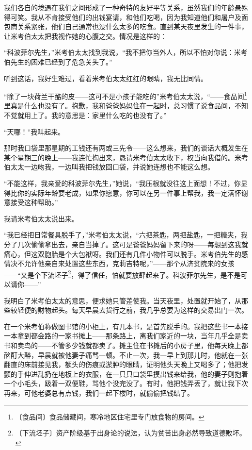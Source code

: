 \documentclass[12pt,UTF-8,openany]{ctexbook}
\begin{document}
\begin{large}
    我们各自的境遇在我们之间形成了一种奇特的友好平等关系，虽然我们的年龄悬殊得可笑。我从不肯接受他们的出钱宴请，和他们吃喝，因为我知道他们和屠户及面包商关系紧张，他们自己通常也没什么太多的吃食。直到某天夜里发生的一件事，让米考伯太太把我视作她的心腹之交。情况是这样的：
    
    “科波菲尔先生，”米考伯太太找到我说，“我不把你当外人，所以不怕对你说：米考伯先生的困难已经到了危急关头了。”
    
    听到这话，我好生难过，看着米考伯太太红红的眼睛，我无比同情。
    
    “除了一块荷兰干酪的皮——这可不是小孩子能吃的”米考伯太太说，“——食品间\footnote{〔食品间〕食品储藏间，寒冷地区住宅里专门放食物的房间。}里真是什么也没有了。抱歉，我和爸爸妈妈住在一起时，总习惯了说食品间，不知不觉就用上了。我的意思是：家里什么吃的也没有了。”
    
    “天哪！”我叫起来。
    
    那时我口袋里那星期的工钱还有两或三先令——这么想来，我们的谈话大概发生在某个星期三的晚上——我连忙掏出来，恳请米考伯太太收下，权当向我借的。米考伯太太一边吻我，一边叫我把钱放回口袋，并说她连想也不能这么想。
    
    “不能这样，我亲爱的科波菲尔先生，”她说，“我压根就没往这上面想！不过，你显得比你的实际年龄要老成，如果你愿意，你可以在另一件事上帮我，我一定满怀谢意接受这种帮助。”
    
    我请米考伯太太说出来。
    
    “我已经把日常餐具脱手了，”米考伯太太说，“六把茶匙，两把盐匙，一把糖夹，我分了几次偷偷拿出去，亲自当掉了。这可是爸爸妈妈留下来的呀——每想到这我就痛心，但这双胞胎是个大包袱呀。我们还有几件小物件可以脱手。米考伯先生的感情决不允许他亲自来处置这些东西，克莉吉特呢，”——那个从济贫院来的女孩——“又是个下流坯子\footnote{〔下流坯子〕资产阶级基于出身论的说法，认为贫苦出身必然导致道德败坏。}，得了信任，怕就要放肆起来了。科波菲尔先生，是不是可以请你——”
    
    我明白了米考伯太太的意思，便求她只管差使我。当天夜里，处置就开始了，从那些较轻便的财物起头。每天早晨去货行之前，我几乎总要为这样的交易出门一次。
    
    在一个米考伯称做图书馆的小柜上，有几本书，是首先脱手的。我把这些书一本接一本拿到都会路的一家书摊上——那条路上，离我们家近的一块，当年几乎全是卖书和卖鸟的——不管多少钱就都卖了。摊主住在书摊后的小房子里，他每天晚上都酩酊大醉，早晨就被他妻子痛骂一顿。不止一次，我一早上到那儿时，他就在一张翻直的床前接见我，额头的伤痕或淤肿的眼睛，证明他头天晚上又喝多了；他把发颤的手伸进乱扔在地板上的衣服，在一只只口袋里摸出钱来给我，他的妻子则抱着一个小毛头，趿着一双便鞋，骂他个没完没了。有时，他把钱弄丢了，就让我下次再来，可他老婆总有点钱，我们一起下楼时，就偷偷把钱结了。
    

\end{large}
\end{document}
